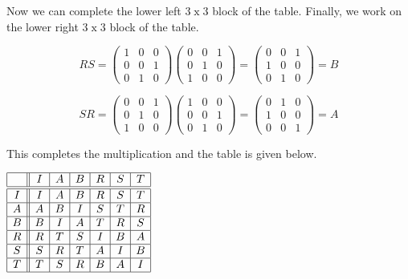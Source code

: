 \documentclass[12pt]{article}
\begin{document}
Now we can complete the lower left $3\operatorname{x}3$ block of the table.  Finally, we work on the lower right $3\operatorname{x}3$ block of the table.

\begin{displaymath}
RS=\left( \begin{array}{ccc}
1 & 0 & 0 \\
0 & 0 & 1 \\
0 & 1 & 0
\end{array} \right )
\left( \begin{array}{ccc}
0 & 0 & 1 \\
0 & 1 & 0 \\
1 & 0 & 0
\end{array} \right )
= \left( \begin{array}{ccc}
0 & 0 & 1 \\
1 & 0 & 0 \\
0 & 1 & 0
\end{array} \right )=B
\end{displaymath}

\begin{displaymath}
SR=\left( \begin{array}{ccc}
0 & 0 & 1 \\
0 & 1 & 0 \\
1 & 0 & 0
\end{array} \right )
\left( \begin{array}{ccc}
1 & 0 & 0 \\
0 & 0 & 1 \\
0 & 1 & 0
\end{array} \right )
= \left( \begin{array}{ccc}
0 & 1 & 0 \\
1 & 0 & 0 \\
0 & 0 & 1
\end{array} \right )=A
\end{displaymath}

This completes the multiplication and the table is given below.

\begin{center}
$\begin{array}{|c||c|c|c|c|c|c|}
\hline
 & I & A & B & R & S & T \\
\hline \hline
I & I & A & B & R & S & T \\
\hline
A & A & B & I & S & T & R \\
\hline
B & B & I & A & T & R & S\\
\hline
R & R & T & S & I & B & A\\
\hline
S & S & R & T & A & I & B\\
\hline
T & T & S & R & B & A & I\\
\hline
\end{array}$
\end{center}
\end{document}
